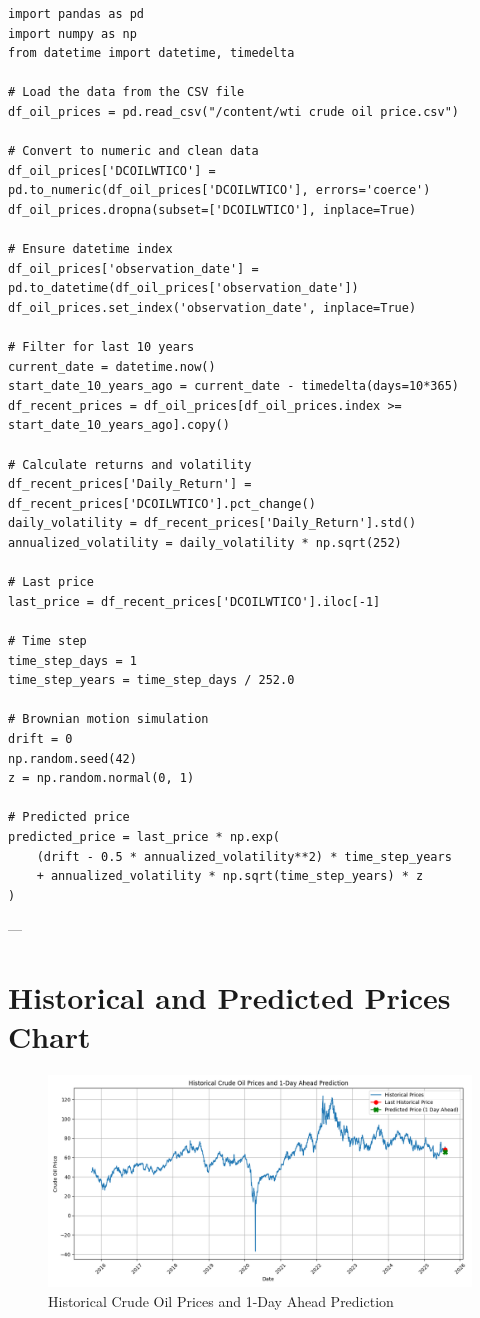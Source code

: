 \documentclass[12pt]{article}
\begin{document}
\begin{lstlisting}[style=mypython]
import pandas as pd
import numpy as np
from datetime import datetime, timedelta

# Load the data from the CSV file
df_oil_prices = pd.read_csv("/content/wti crude oil price.csv")

# Convert to numeric and clean data
df_oil_prices['DCOILWTICO'] = pd.to_numeric(df_oil_prices['DCOILWTICO'], errors='coerce')
df_oil_prices.dropna(subset=['DCOILWTICO'], inplace=True)

# Ensure datetime index
df_oil_prices['observation_date'] = pd.to_datetime(df_oil_prices['observation_date'])
df_oil_prices.set_index('observation_date', inplace=True)

# Filter for last 10 years
current_date = datetime.now()
start_date_10_years_ago = current_date - timedelta(days=10*365)
df_recent_prices = df_oil_prices[df_oil_prices.index >= start_date_10_years_ago].copy()

# Calculate returns and volatility
df_recent_prices['Daily_Return'] = df_recent_prices['DCOILWTICO'].pct_change()
daily_volatility = df_recent_prices['Daily_Return'].std()
annualized_volatility = daily_volatility * np.sqrt(252)

# Last price
last_price = df_recent_prices['DCOILWTICO'].iloc[-1]

# Time step
time_step_days = 1
time_step_years = time_step_days / 252.0

# Brownian motion simulation
drift = 0
np.random.seed(42)
z = np.random.normal(0, 1)

# Predicted price
predicted_price = last_price * np.exp(
    (drift - 0.5 * annualized_volatility**2) * time_step_years
    + annualized_volatility * np.sqrt(time_step_years) * z
)
\end{lstlisting}

---

\section{Historical and Predicted Prices Chart}

\begin{figure}[ht!]
    \centering
    \includegraphics[width=\textwidth]{crude_oil_price_prediction_chart.png}
    \caption{Historical Crude Oil Prices and 1-Day Ahead Prediction}
\end{figure}
\end{document}
